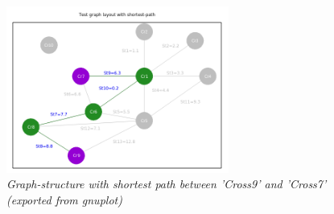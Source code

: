 \documentclass{article}                                                                                                     %
\begin{document}
  \begin{figure}[ht!]                                                                                                       %
    \centering                                                                                                              %
    \includegraphics[width=0.65\textwidth]{../../sw/gnuplot/exports/imgs/personalized_shortest_path.png}                    %
    \caption{\textit{Graph-structure with shortest path between 'Cross9' and 'Cross7' (exported from gnuplot)}}             %
    \label{fig:gnuplot2}                                                                                                    %
  \end{figure}                                                                                                              %

\end{document}
